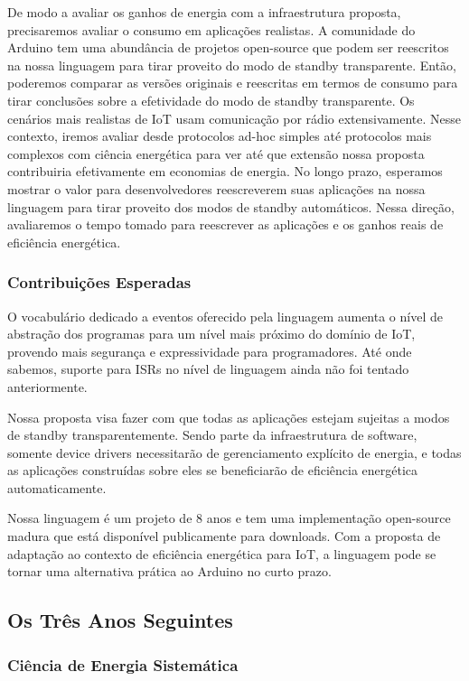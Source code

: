 \documentclass[12pt,english]{amsart}
\begin{document}
De modo a avaliar os ganhos de energia com a infraestrutura proposta,
precisaremos avaliar o consumo em aplicações realistas.
%
A comunidade do Arduino tem uma abundância de projetos open-source que podem
ser reescritos na nossa linguagem para tirar proveito do modo de standby
transparente.
%
Então, poderemos comparar as versões originais e reescritas em termos de
consumo para tirar conclusões sobre a efetividade do modo de standby
transparente.
%
Os cenários mais realistas de IoT usam comunicação por rádio extensivamente.
%
Nesse contexto, iremos avaliar desde protocolos ad-hoc simples até protocolos
mais complexos com ciência energética para ver até que extensão nossa proposta
contribuiria efetivamente em economias de energia.
%
No longo prazo, esperamos mostrar o valor para desenvolvedores reescreverem
suas aplicações na nossa linguagem para tirar proveito dos modos de standby
automáticos.
%
Nessa direção, avaliaremos o tempo tomado para reescrever as aplicações e os
ganhos reais de eficiência energética.

\subsubsection{\textbf{Contribuições Esperadas}}

O vocabulário dedicado a eventos oferecido pela linguagem aumenta o nível de
abstração dos programas para um nível mais próximo do domínio de IoT, provendo
mais segurança e expressividade para programadores.
Até onde sabemos, suporte para ISRs no nível de linguagem ainda não foi
tentado anteriormente.

Nossa proposta visa fazer com que todas as aplicações estejam sujeitas a modos
de standby transparentemente.
Sendo parte da infraestrutura de software, somente device drivers necessitarão
de gerenciamento explícito de energia, e todas as aplicações construídas sobre
eles se beneficiarão de eficiência energética automaticamente.

Nossa linguagem é um projeto de 8 anos e tem uma implementação open-source
madura que está disponível publicamente para downloads.
Com a proposta de adaptação ao contexto de eficiência energética para IoT, a
linguagem pode se tornar uma alternativa prática ao Arduino no curto prazo.

\subsection{Os Três Anos Seguintes}

\subsubsection{Ciência de Energia Sistemática}
\label{sec.method.systematic}
\end{document}
